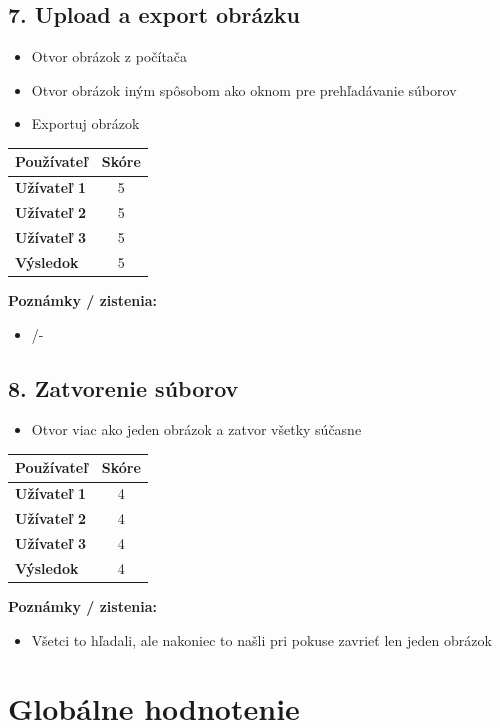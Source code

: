 \documentclass[a4paper,12pt]{article}
\begin{document}
\subsection*{7. Upload a export obrázku}
\begin{itemize}
    \item Otvor obrázok z počítača
    \item Otvor obrázok iným spôsobom ako oknom pre prehľadávanie súborov
    \item Exportuj obrázok 
\end{itemize}

\begin{longtable}{>{\bfseries}l c}
\toprule
Používateľ & Skóre \\
\midrule
Užívateľ 1 & 5 \\
Užívateľ 2 & 5 \\
Užívateľ 3 & 5 \\
Výsledok & 5 \\
\bottomrule
\end{longtable}

\textbf{Poznámky / zistenia:}
\begin{itemize}
    \item /-
\end{itemize}

\subsection*{8. Zatvorenie súborov}
\begin{itemize}
    \item Otvor viac ako jeden obrázok a zatvor všetky súčasne 
\end{itemize}

\begin{longtable}{>{\bfseries}l c}
\toprule
Používateľ & Skóre \\
\midrule
Užívateľ 1 & 4 \\
Užívateľ 2 & 4 \\
Užívateľ 3 & 4 \\
Výsledok & 4 \\
\bottomrule
\end{longtable}

\textbf{Poznámky / zistenia:}
\begin{itemize}
    \item Všetci to hľadali, ale nakoniec to našli pri pokuse zavrieť len jeden obrázok
\end{itemize}

\section*{Globálne hodnotenie}
\end{document}
